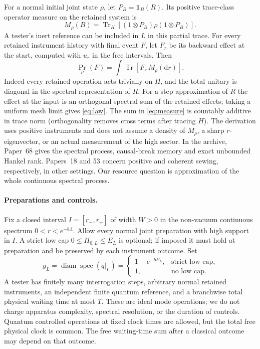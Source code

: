 \documentclass[11pt]{article}
\theoremstyle{remark}
\newcommand{\tr}{\operatorname{Tr}}
\newcommand{\dd}{\mathrm{d}}
\begin{document}
For a normal initial joint state \(\rho\), let \(P_B=\mathbf1_B(R)\).
Its positive trace-class operator measure on the retained system is
\begin{equation}\label{eq:measure}
 M_\rho(B)=
 \tr_H\!\left[(1\otimes P_B)\rho(1\otimes P_B)\right].
\end{equation}
A tester's inert reference can be included in \(L\) in this partial
trace. For every retained instrument history with final event \(F\),
let \(F_r\) be its backward effect at the start, computed with
\(u_r\) in the free intervals. Then
\begin{equation}\label{eq:law}
 \Pr_\rho(F)=\int\tr\!\left[F_r\,M_\rho(\dd r)\right].
\end{equation}
Indeed every retained operation acts trivially on \(H\), and the
total unitary is diagonal in the spectral representation of \(R\).
For a step approximation of \(R\) the effect at the input is an
orthogonal spectral sum of the retained effects; taking a uniform
mesh limit gives \eqref{eq:law}. The sum in \eqref{eq:measure} is
countably additive in trace norm (orthogonality removes cross terms
after tracing \(H\)). The derivation uses positive instruments and
does not assume a density of \(M_\rho\), a sharp \(r\)-eigenvector,
or an actual measurement of the high sector. In the archive,
Paper~68 \cite{P68} gives the spectral process, causal-break memory
and exact unbounded Hankel rank. Papers~18 and 53 \cite{P18,P53}
concern positive and coherent sewing, respectively, in other
settings. Our resource question is approximation of the whole
continuous spectral process.

\paragraph{Preparations and controls.}
Fix a closed interval \(I=[r_-,r_+]\) of width \(W>0\) in the
non-vacuum continuous spectrum \(0<r<e^{-b\Lambda}\).
Allow every normal joint preparation with high support in \(I\).
A strict low cap \(0\le H_{0,L}\le E_L\) is optional; if imposed it
must hold at preparation and be preserved by each instrument outcome.
Set
\[
 g_L=\operatorname{diam}\operatorname{spec}(q|_L)
     =
 \begin{cases}
  1-e^{-bE_L},&\text{strict low cap},\\
  1,&\text{no low cap}.
 \end{cases}
\]
A tester has finitely many interrogation steps, arbitrary normal
retained instruments, an independent finite quantum reference, and
a branchwise total physical waiting time at most \(T\). These are
ideal mode operations; we do not charge apparatus complexity,
spectral resolution, or the duration of controls. Quantum
controlled operations at fixed clock times are allowed, but the total
free physical clock is common. The free waiting-time sum after a
classical outcome may depend on that outcome.
\end{document}
